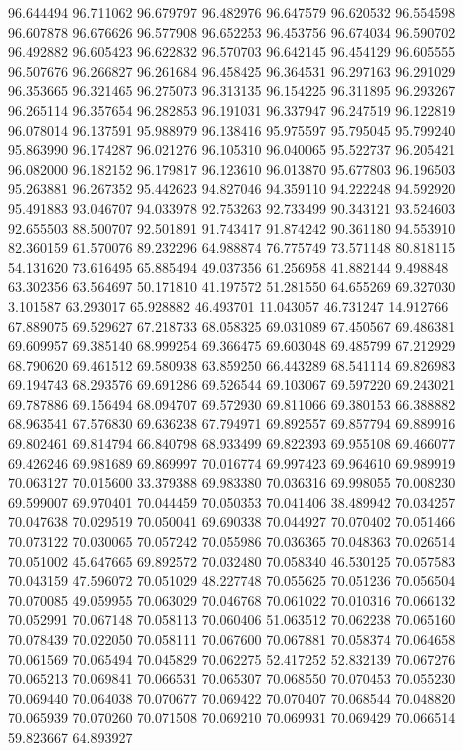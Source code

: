 96.644494
96.711062
96.679797
96.482976
96.647579
96.620532
96.554598
96.607878
96.676626
96.577908
96.652253
96.453756
96.674034
96.590702
96.492882
96.605423
96.622832
96.570703
96.642145
96.454129
96.605555
96.507676
96.266827
96.261684
96.458425
96.364531
96.297163
96.291029
96.353665
96.321465
96.275073
96.313135
96.154225
96.311895
96.293267
96.265114
96.357654
96.282853
96.191031
96.337947
96.247519
96.122819
96.078014
96.137591
95.988979
96.138416
95.975597
95.795045
95.799240
95.863990
96.174287
96.021276
96.105310
96.040065
95.522737
96.205421
96.082000
96.182152
96.179817
96.123610
96.013870
95.677803
96.196503
95.263881
96.267352
95.442623
94.827046
94.359110
94.222248
94.592920
95.491883
93.046707
94.033978
92.753263
92.733499
90.343121
93.524603
92.655503
88.500707
92.501891
91.743417
91.874242
90.361180
94.553910
82.360159
61.570076
89.232296
64.988874
76.775749
73.571148
80.818115
54.131620
73.616495
65.885494
49.037356
61.256958
41.882144
9.498848
63.302356
63.564697
50.171810
41.197572
51.281550
64.655269
69.327030
3.101587
63.293017
65.928882
46.493701
11.043057
46.731247
14.912766
67.889075
69.529627
67.218733
68.058325
69.031089
67.450567
69.486381
69.609957
69.385140
68.999254
69.366475
69.603048
69.485799
67.212929
68.790620
69.461512
69.580938
63.859250
66.443289
68.541114
69.826983
69.194743
68.293576
69.691286
69.526544
69.103067
69.597220
69.243021
69.787886
69.156494
68.094707
69.572930
69.811066
69.380153
66.388882
68.963541
67.576830
69.636238
67.794971
69.892557
69.857794
69.889916
69.802461
69.814794
66.840798
68.933499
69.822393
69.955108
69.466077
69.426246
69.981689
69.869997
70.016774
69.997423
69.964610
69.989919
70.063127
70.015600
33.379388
69.983380
70.036316
69.998055
70.008230
69.599007
69.970401
70.044459
70.050353
70.041406
38.489942
70.034257
70.047638
70.029519
70.050041
69.690338
70.044927
70.070402
70.051466
70.073122
70.030065
70.057242
70.055986
70.036365
70.048363
70.026514
70.051002
45.647665
69.892572
70.032480
70.058340
46.530125
70.057583
70.043159
47.596072
70.051029
48.227748
70.055625
70.051236
70.056504
70.070085
49.059955
70.063029
70.046768
70.061022
70.010316
70.066132
70.052991
70.067148
70.058113
70.060406
51.063512
70.062238
70.065160
70.078439
70.022050
70.058111
70.067600
70.067881
70.058374
70.064658
70.061569
70.065494
70.045829
70.062275
52.417252
52.832139
70.067276
70.065213
70.069841
70.066531
70.065307
70.068550
70.070453
70.055230
70.069440
70.064038
70.070677
70.069422
70.070407
70.068544
70.048820
70.065939
70.070260
70.071508
70.069210
70.069931
70.069429
70.066514
59.823667
64.893927
